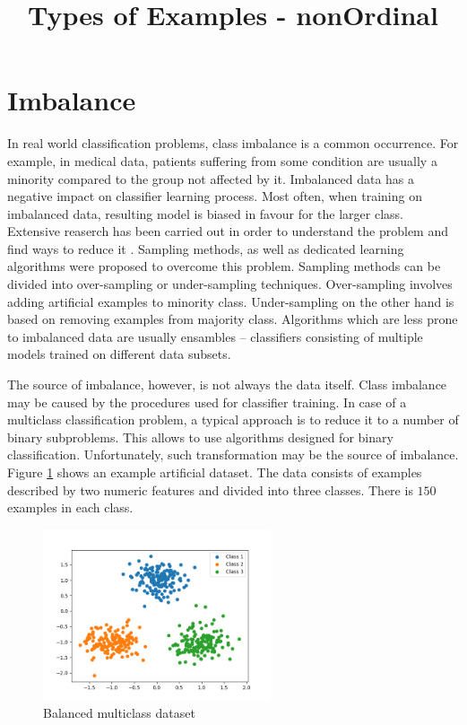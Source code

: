 \documentclass[12pt]{article}
\title{Types of Examples - nonOrdinal}
\begin{document}
\section{Imbalance}

In real world classification problems, class imbalance is a common occurrence. For example, in medical data, patients suffering from some condition are usually a minority compared to the group not affected by it. Imbalanced data has a negative impact on classifier learning process. Most often, when training on imbalanced data, resulting model is biased in favour for the larger class. Extensive reaserch has been carried out in order to understand the problem and find ways to reduce it \cite{Napierala2016, Blaszczynski2014}. Sampling methods, as well as dedicated learning algorithms were proposed to overcome this problem. Sampling methods can be divided into over-sampling or under-sampling techniques. Over-sampling involves adding artificial examples to minority class. Under-sampling on the other hand is based on removing examples from majority class. Algorithms which are less prone to imbalanced data are usually ensambles -- classifiers consisting of multiple models trained on different data subsets.

The source of imbalance, however, is not always the data itself. Class imbalance may be caused by the procedures used for classifier training. In case of a multiclass classification problem, a typical approach is to reduce it to a number of binary subproblems. This allows to use algorithms designed for binary classification. Unfortunately, such transformation may be the source of imbalance. Figure \ref{img:balanced} shows an example artificial dataset. The data consists of examples described by two numeric features and divided into three classes. There is $150$ examples in each class.

\begin{figure}[H]
\centering
\includegraphics[width=0.6\textwidth]{balanced_data.png}
\caption{Balanced multiclass dataset}
\label{img:balanced}
\end{figure}
\end{document}
